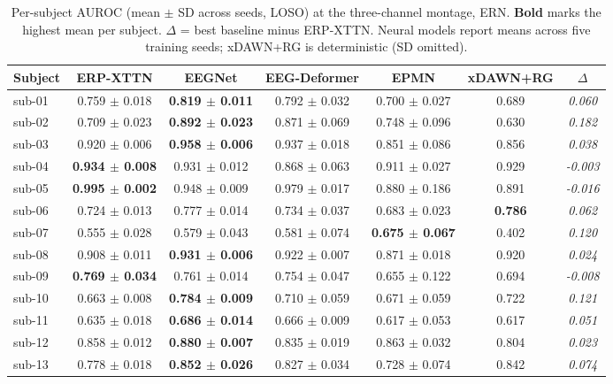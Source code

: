 \begin{table}[t]
\centering
\caption{Per-subject AUROC (mean $\pm$ SD across seeds, LOSO) at the three-channel montage, ERN. \textbf{Bold} marks the highest mean per subject. $\Delta$ = best baseline minus ERP-XTTN. Neural models report means across five training seeds; xDAWN+RG is deterministic (SD omitted).}
\label{sup:tab-persubj-ern}
\begin{tabular}{lcccccc}
\toprule
Subject & ERP-XTTN & EEGNet & EEG-Deformer & EPMN & xDAWN+RG & $\Delta$ \\
\midrule
sub-01 & 0.759 $\pm$ 0.018 & \textbf{0.819 $\pm$ 0.011} & 0.792 $\pm$ 0.032 & 0.700 $\pm$ 0.027 & 0.689 & \textit{0.060} \\
sub-02 & 0.709 $\pm$ 0.023 & \textbf{0.892 $\pm$ 0.023} & 0.871 $\pm$ 0.069 & 0.748 $\pm$ 0.096 & 0.630 & \textit{0.182} \\
sub-03 & 0.920 $\pm$ 0.006 & \textbf{0.958 $\pm$ 0.006} & 0.937 $\pm$ 0.018 & 0.851 $\pm$ 0.086 & 0.856 & \textit{0.038} \\
sub-04 & \textbf{0.934 $\pm$ 0.008} & 0.931 $\pm$ 0.012 & 0.868 $\pm$ 0.063 & 0.911 $\pm$ 0.027 & 0.929 & \textit{-0.003} \\
sub-05 & \textbf{0.995 $\pm$ 0.002} & 0.948 $\pm$ 0.009 & 0.979 $\pm$ 0.017 & 0.880 $\pm$ 0.186 & 0.891 & \textit{-0.016} \\
sub-06 & 0.724 $\pm$ 0.013 & 0.777 $\pm$ 0.014 & 0.734 $\pm$ 0.037 & 0.683 $\pm$ 0.023 & \textbf{0.786} & \textit{0.062} \\
sub-07 & 0.555 $\pm$ 0.028 & 0.579 $\pm$ 0.043 & 0.581 $\pm$ 0.074 & \textbf{0.675 $\pm$ 0.067} & 0.402 & \textit{0.120} \\
sub-08 & 0.908 $\pm$ 0.011 & \textbf{0.931 $\pm$ 0.006} & 0.922 $\pm$ 0.007 & 0.871 $\pm$ 0.018 & 0.920 & \textit{0.024} \\
sub-09 & \textbf{0.769 $\pm$ 0.034} & 0.761 $\pm$ 0.014 & 0.754 $\pm$ 0.047 & 0.655 $\pm$ 0.122 & 0.694 & \textit{-0.008} \\
sub-10 & 0.663 $\pm$ 0.008 & \textbf{0.784 $\pm$ 0.009} & 0.710 $\pm$ 0.059 & 0.671 $\pm$ 0.059 & 0.722 & \textit{0.121} \\
sub-11 & 0.635 $\pm$ 0.018 & \textbf{0.686 $\pm$ 0.014} & 0.666 $\pm$ 0.009 & 0.617 $\pm$ 0.053 & 0.617 & \textit{0.051} \\
sub-12 & 0.858 $\pm$ 0.012 & \textbf{0.880 $\pm$ 0.007} & 0.835 $\pm$ 0.019 & 0.863 $\pm$ 0.032 & 0.804 & \textit{0.023} \\
sub-13 & 0.778 $\pm$ 0.018 & \textbf{0.852 $\pm$ 0.026} & 0.827 $\pm$ 0.034 & 0.728 $\pm$ 0.074 & 0.842 & \textit{0.074} \\

\end{tabular}
\end{table}
